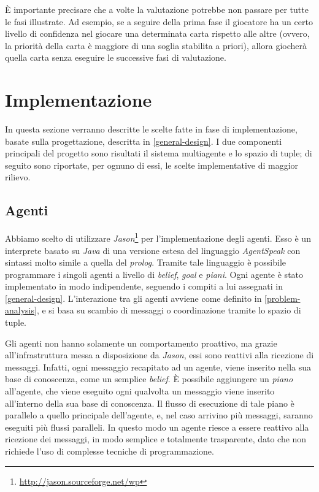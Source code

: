 \documentclass[a4paper,12pt]{article}
\begin{document}
È importante precisare che a volte la valutazione potrebbe non passare per tutte le fasi illustrate. Ad esempio, se a seguire della prima fase il giocatore ha un certo livello di confidenza nel giocare una determinata carta rispetto alle altre (ovvero, la priorità della carta è maggiore di una soglia stabilita a priori), allora giocherà quella carta senza eseguire le successive fasi di valutazione. 

\section{Implementazione} \label{implementation}
In questa sezione verranno descritte le scelte fatte in fase di implementazione, basate sulla progettazione, descritta in \autoref{general-design}. I due componenti principali del progetto sono risultati il sistema multiagente e lo spazio di tuple; di seguito sono riportate, per ognuno di essi, le scelte implementative di maggior rilievo.  
\subsection{Agenti}
	Abbiamo scelto di utilizzare \emph{Jason}\footnote{\url{http://jason.sourceforge.net/wp}} per l'implementazione degli agenti. Esso è un interprete basato su \emph{Java} di una versione estesa del linguaggio \emph{AgentSpeak} con sintassi molto simile a quella del \emph{prolog}. Tramite tale linguaggio è possibile programmare i singoli agenti a livello di \emph{belief}, \emph{goal} e \emph{piani}. Ogni agente è stato implementato in modo indipendente, seguendo i compiti a lui assegnati in \autoref{general-design}. L'interazione tra gli agenti avviene come definito in \autoref{problem-analysis}, e si basa su scambio di messaggi o coordinazione tramite lo spazio di tuple. 
	
	Gli agenti non hanno solamente un comportamento proattivo, ma grazie all'infrastruttura messa a disposizione da \emph{Jason}, essi sono reattivi alla ricezione di messaggi. Infatti, ogni messaggio recapitato ad un agente, viene inserito nella sua base di conoscenza, come un semplice \emph{belief}. \`{E} possibile aggiungere un \emph{piano} all'agente, che viene eseguito ogni qualvolta un messaggio viene inserito all'interno della sua base di conoscenza. Il flusso di esecuzione di tale piano è parallelo a quello principale dell'agente, e, nel caso arrivino più messaggi, saranno eseguiti più flussi paralleli. In questo modo un agente riesce a essere reattivo alla ricezione dei messaggi, in modo semplice e totalmente trasparente, dato che non richiede l'uso di complesse tecniche di programmazione.
\end{document}
